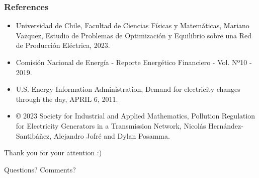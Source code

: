 \documentclass[
11pt, %
]{beamer}
\begin{document}
	
	\begin{frame}
		\frametitle{References}
		\begin{itemize}
			\item Universidad de Chile, Facultad de Ciencias F\'isicas y Matem\'aticas, Mariano Vazquez, Estudio de Problemas de Optimizaci\'on y Equilibrio sobre una Red de Producci\'on El\'ectrica, 2023.
			\item Comisión Nacional de Energía - Reporte Energético Financiero - Vol. Nº10 - 2019.
			\item U.S. Energy Information Administration, Demand for electricity changes through the day, APRIL 6, 2011.
			\item  © 2023 Society for Industrial and Applied Mathematics, Pollution Regulation for Electricity Generators in a Transmission Network, Nicol\'as Hern\'andez-Santib\'a\~{n}ez, Alejandro Jofr\'e and Dylan Posamma.	
		\end{itemize}
	\end{frame}
	
	\begin{frame}[plain] %
		\begin{center}
			{\LARGE Thank you for your attention :)}
			
			\bigskip\bigskip %
			
			{\LARGE Questions? Comments?}
		\end{center}
	\end{frame}
	
	
\end{document}
